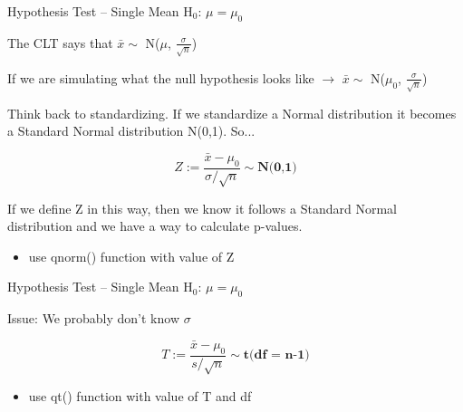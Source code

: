\documentclass{beamer}
\begin{document}
\begin{frame}{Hypothesis Test -- Single Mean}
H$_0$: $\mu = \mu_0$ \vspace{4mm}

The CLT says that $\bar{x} \sim$ N($\mu$, $\frac{\sigma}{\sqrt{n}}$) \vspace{4mm}

If we are simulating what the null hypothesis looks like $\rightarrow$ $\bar{x} \sim$ N($\mu_0$, $\frac{\sigma}{\sqrt{n}}$) \vspace{4mm}

Think back to standardizing. If we standardize a Normal distribution it becomes a Standard Normal distribution N(0,1). So...\vspace{2mm}

\begin{equation*}
    Z := \frac{\bar{x}-\mu_0}{\sigma / \sqrt{n}} \sim \textbf{N(0,1)}
\end{equation*}

If we define Z in this way, then we know it follows a Standard Normal distribution and we have a way to calculate p-values.
\begin{itemize}
    \item use qnorm() function with value of Z
\end{itemize}
\end{frame}

\begin{frame}{Hypothesis Test -- Single Mean}
H$_0$: $\mu = \mu_0$ \vspace{4mm}

Issue: We probably don't know $\sigma$ \vspace{2mm}

\begin{equation*}
    T := \frac{\bar{x}-\mu_0}{s / \sqrt{n}} \sim \textbf{t(df = n-1)}
\end{equation*}
\begin{itemize}
    \item use qt() function with value of T and df
\end{itemize}
\end{frame}
\end{document}
